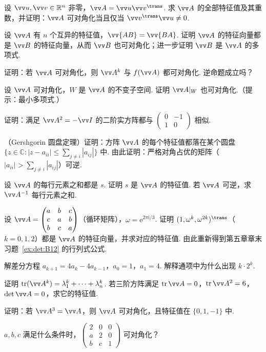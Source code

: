 {		\Bgroup
		\begin{exB}
			\item\label{ex:eig:B1} 设 $\vv u,\vv v\in\mathbb{R}^n$ 非零，$\vv A=\vv u\vv v^\trans$. 求 $\vv A$ 的全部特征值及其重数，并证明：$\vv A$ 可对角化当且仅当 $\vv v^\trans\vv u\ne0$.
			\item\label{ex:eig:B2} 设 $\vv A$ 有 $n$ 个互异的特征值，$\vv{AB}=\vv{BA}$. 证明 $\vv A$ 的特征向量都是 $\vv B$ 的特征向量，从而 $\vv B$ 也可对角化；进一步证明 $\vv B$ 是 $\vv A$ 的多项式.
			\item\label{ex:eig:B3} 证明：若 $\vv A$ 可对角化，则 $\vv A^k$ 与 $f(\vv A)$ 都可对角化. 逆命题成立吗？
			\item\label{ex:eig:B4} 设 $\vv A$ 可对角化，$W$ 是 $\vv A$ 的不变子空间. 证明 $\vv A|_W$ 也可对角化.（提示：最小多项式.）
			\item\label{ex:eig:B5} 证明：满足 $\vv A^2=-\vv I$ 的二阶实方阵都与 $\begin{pmatrix}0&-1\\1&0\end{pmatrix}$ 相似.
			\item\label{ex:eig:B6} （Gershgorin 圆盘定理）证明：方阵 $\vv A$ 的每个特征值都落在某个圆盘 $\{z\in\mathbb{C}:|z-a_{ii}|\le\sum_{j\ne i}|a_{ij}|\}$ 中. 由此证明：严格对角占优的矩阵（$|a_{ii}|>\sum_{j\ne i}|a_{ij}|$）可逆.
			\item\label{ex:eig:B7} 设 $\vv A$ 的每行元素之和都是 $s$. 证明 $s$ 是 $\vv A$ 的特征值. 若 $\vv A$ 可逆，求 $\vv A^{-1}$ 每行元素之和.
			\item\label{ex:eig:B8} 设 $\vv A=\begin{pmatrix}a&b&c\\c&a&b\\b&c&a\end{pmatrix}$（循环矩阵），$\omega=\mathrm e^{2\pi\mathrm i/3}$. 证明 $(1,\omega^k,\omega^{2k})^\trans$（$k=0,1,2$）都是 $\vv A$ 的特征向量，并求对应的特征值. 由此重新得到第五章章末习题~\ref{ex:det:B12} 的行列式公式.
			\item\label{ex:eig:B9} 解差分方程 $a_{k+1}=4a_k-4a_{k-1}$，$a_0=1$，$a_1=4$. 解释通项中为什么出现 $k\cdot2^k$.
			\item\label{ex:eig:B10} 证明 $\tr(\vv A^k)=\lambda_1^k+\cdots+\lambda_n^k$. 若三阶方阵满足 $\tr\vv A=0$，$\tr\vv A^2=6$，$\det\vv A=0$，求它的特征值.
			\item\label{ex:eig:B11} 证明：若 $\vv A^3=\vv A$，则 $\vv A$ 可对角化，且特征值在 $\{0,1,-1\}$ 中.
			\item\label{ex:eig:B12} $a,b,c$ 满足什么条件时，$\begin{pmatrix}2&0&0\\a&2&0\\b&c&1\end{pmatrix}$ 可对角化？

\end{exB}}
